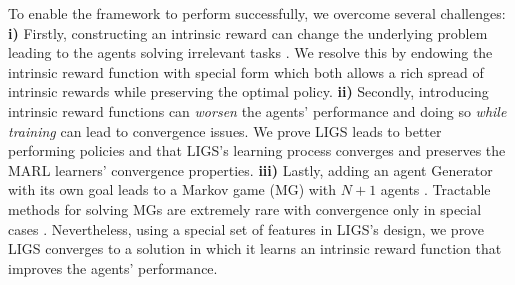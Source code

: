 \documentclass{article}
\begin{document}
To enable the framework to perform successfully, we overcome several challenges: 
\textbf{i)} Firstly, constructing an intrinsic reward can change the underlying problem leading to the agents solving irrelevant tasks  \cite{mannion2017policy}. We resolve this by endowing the intrinsic reward function with special form which both allows a rich spread of intrinsic rewards while preserving the optimal policy. 
\textbf{ii)} Secondly, introducing intrinsic reward functions can \textit{worsen} the agents' performance \cite{devlin2011theoretical} and doing so \textit{while training} can lead to convergence issues.  We prove LIGS leads to better performing policies and that LIGS's learning process converges and preserves the MARL learners' convergence properties. 
\textbf{iii)} Lastly, adding an agent {\selectfont Generator} with its own goal leads to a Markov game (MG) with $N+1$ agents \cite{fudenberg1991tirole}. 
Tractable methods for solving MGs are extremely rare with convergence only in special cases  \cite{yang2020overview}. Nevertheless, using a special set of features in LIGS's design, we prove LIGS converges to a solution in which it learns an intrinsic reward function that improves the agents' performance.


\end{document}
